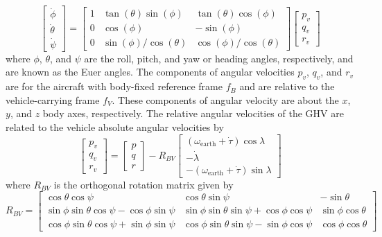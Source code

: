 \begin{equation}
  \label{eqn.bodyRatesToEulerRates}
  \left[
  \begin{array}{c}
    \dot{\phi} \\
    \dot{\theta} \\
    \dot{\psi}
  \end{array}\right]=
  \left[
  \begin{array}{ccc}
    1 & \tan(\theta)\sin(\phi) & \tan(\theta)\cos(\phi) \\
    0 & \cos(\phi) & -\sin(\phi) \\
    0 & \sin(\phi)/\cos(\theta) & \cos(\phi)/\cos(\theta)
  \end{array}\right]
  \left[
  \begin{array}{c}
    p_{v} \\
    q_{v} \\
    r_{v}
  \end{array}\right]
\end{equation}
where $\phi$, $\theta$, and $\psi$ are the roll, pitch, and yaw or heading angles, respectively, and are known as the Euer angles.
The components of angular velocities $p_{v}$, $q_{v}$, and $r_{v}$ are for the aircraft with body-fixed reference frame $f_{B}$ and are relative to the vehicle-carrying frame $f_{V}$.
These components of angular velocity are about the $x$, $y$, and $z$ body axes, respectively.
The relative angular velocities of the GHV are related to the vehicle absolute angular velocities by
\begin{equation*}
  \begin{bmatrix}
    p_{v} \\
    q_{v} \\
    r_{v}
  \end{bmatrix}=
  \begin{bmatrix}
    p \\
    q \\
    r
  \end{bmatrix}-R_{BV}
  \begin{bmatrix}
    (\omega_{\text{earth}}+\dot{\tau})\cos{\lambda} \\
    -\dot{\lambda} \\
    -(\omega_{\text{earth}}+\dot{\tau})\sin{\lambda}
  \end{bmatrix}
\end{equation*}
where $R_{BV}$ is the orthogonal rotation matrix given by
\begin{equation*}
  R_{BV}=
  \begin{bmatrix}
    \cos{\theta}\cos{\psi} & \cos{\theta}\sin{\psi} & -\sin{\theta} \\
    \sin{\phi}\sin{\theta}\cos{\psi}-\cos{\phi}\sin{\psi} &  \sin{\phi}\sin{\theta}\sin{\psi}+\cos{\phi}\cos{\psi} & \sin{\phi}\cos{\theta}\\
    \cos{\phi}\sin{\theta}\cos{\psi}+\sin{\phi}\sin{\psi} &  \cos{\phi}\sin{\theta}\sin{\psi}-\sin{\phi}\cos{\psi} & \cos{\phi}\cos{\theta}
  \end{bmatrix}
\end{equation*}

